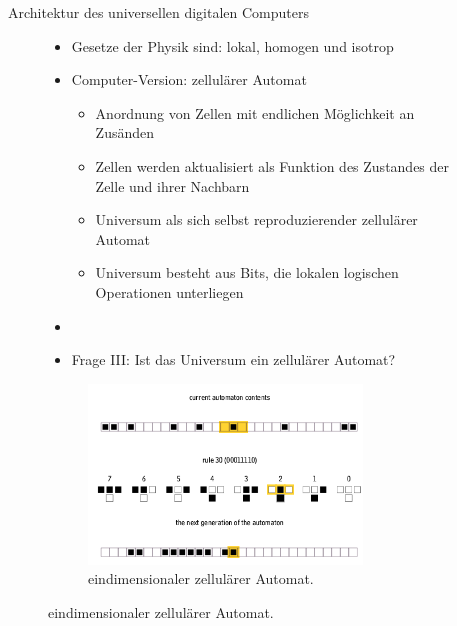 \documentclass[aspectratio=1610, 9pt]{beamer}
\begin{document}
\begin{frame}{Architektur des universellen digitalen Computers}
  \begin{figure}
    \begin{minipage}{0.49\textwidth}
      \begin{itemize}
        \item Gesetze der Physik sind: lokal, homogen und isotrop
        \item[\rightarrow] Computer-Version: zellulärer Automat
        \begin{itemize}
          \item Anordnung von Zellen mit endlichen Möglichkeit an Zusänden
          \item Zellen werden aktualisiert als Funktion des Zustandes der Zelle und ihrer Nachbarn
          \item Universum als sich selbst reproduzierender zellulärer Automat
          \item Universum besteht aus Bits, die lokalen logischen Operationen unterliegen
        \end{itemize}
        \item[]
        \item[\rightarrow] Frage III: Ist das Universum ein zellulärer Automat?
      \end{itemize}
    \end{minipage}
    \hfill
    \begin{minipage}{0.49\textwidth}
      \begin{figure}
        \includegraphics[width=0.8\textwidth]{images/zelle.png}
        \caption{eindimensionaler zellulärer Automat.}
      \end{figure}
    \end{minipage}
  \end{figure}


\end{frame}
\end{document}

